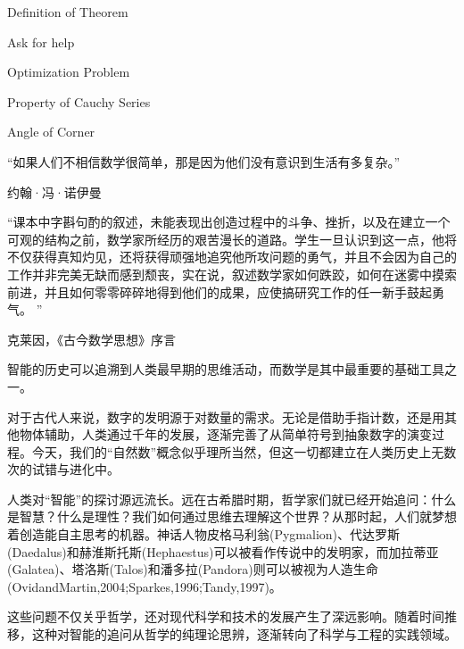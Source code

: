 
\begin{introduction}
\item Definition of Theorem
\item Ask for help
\item Optimization Problem
\item Property of Cauchy Series
\item Angle of Corner
\end{introduction}

“如果人们不相信数学很简单，那是因为他们没有意识到生活有多复杂。”
\begin{flushright}
约翰·冯·诺伊曼
\end{flushright}

“课本中字斟句酌的叙述，未能表现出创造过程中的斗争、挫折，以及在建立一个可观的结构之前，数学家所经历的艰苦漫长的道路。学生一旦认识到这一点，他将不仅获得真知灼见，还将获得顽强地追究他所攻问题的勇气，并且不会因为自己的工作并非完美无缺而感到颓丧，实在说，叙述数学家如何跌跤，如何在迷雾中摸索前进，并且如何零零碎碎地得到他们的成果，应使搞研究工作的任一新手鼓起勇气。  ”
\begin{flushright}
                                                 克莱因，《古今数学思想》序言
\end{flushright}

智能的历史可以追溯到人类最早期的思维活动，而数学是其中最重要的基础工具之一。

对于古代人来说，数字的发明源于对数量的需求。无论是借助手指计数，还是用其他物体辅助，人类通过千年的发展，逐渐完善了从简单符号到抽象数字的演变过程。今天，我们的“自然数”概念似乎理所当然，但这一切都建立在人类历史上无数次的试错与进化中。

人类对“智能”的探讨源远流长。远在古希腊时期，哲学家们就已经开始追问：什么是智慧？什么是理性？我们如何通过思维去理解这个世界？从那时起，人们就梦想着创造能自主思考的机器。神话人物皮格马利翁(Pygmalion)、代达罗斯(Daedalus)和赫淮斯托斯(Hephaestus)可以被看作传说中的发明家，而加拉蒂亚(Galatea)、塔洛斯(Talos)和潘多拉(Pandora)则可以被视为人造生命(OvidandMartin,2004;Sparkes,1996;Tandy,1997)。

这些问题不仅关乎哲学，还对现代科学和技术的发展产生了深远影响。随着时间推移，这种对智能的追问从哲学的纯理论思辨，逐渐转向了科学与工程的实践领域。

